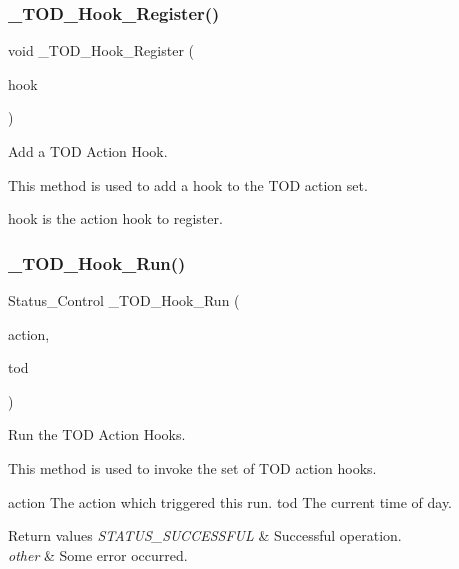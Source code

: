 \subsubsection{\texorpdfstring{\_TOD\_Hook\_Register()}{\_TOD\_Hook\_Register()}}
{\footnotesize\ttfamily void \+\_\+\+T\+O\+D\+\_\+\+Hook\+\_\+\+Register (\begin{DoxyParamCaption}\item[{\mbox{\hyperlink{structTOD__Hook}{T\+O\+D\+\_\+\+Hook}} $\ast$}]{hook }\end{DoxyParamCaption})}



Add a T\+OD Action Hook. 

This method is used to add a hook to the T\+OD action set.

hook is the action hook to register. \mbox{\label{group__RTEMSScoreTODHooks_ga115a4768c4a7c4fd838809465fc3d6e8}} 
\subsubsection{\texorpdfstring{\_TOD\_Hook\_Run()}{\_TOD\_Hook\_Run()}}
{\footnotesize\ttfamily Status\+\_\+\+Control \+\_\+\+T\+O\+D\+\_\+\+Hook\+\_\+\+Run (\begin{DoxyParamCaption}\item[{\mbox{\hyperlink{group__RTEMSScoreTODHooks_gab9b3d7e3a626139950c25efa888d4332}{T\+O\+D\+\_\+\+Action}}}]{action,  }\item[{const struct timespec $\ast$}]{tod }\end{DoxyParamCaption})}



Run the T\+OD Action Hooks. 

This method is used to invoke the set of T\+OD action hooks.

action The action which triggered this run. tod The current time of day.


\begin{DoxyRetVals}{Return values}
{\em S\+T\+A\+T\+U\+S\+\_\+\+S\+U\+C\+C\+E\+S\+S\+F\+UL} & Successful operation. \\
\hline
{\em other} & Some error occurred. \\
\hline
\end{DoxyRetVals}
\mbox{\label{group__RTEMSScoreTODHooks_ga1d70eadc6cc3f1c7766d9fb6b8709e65}} 
